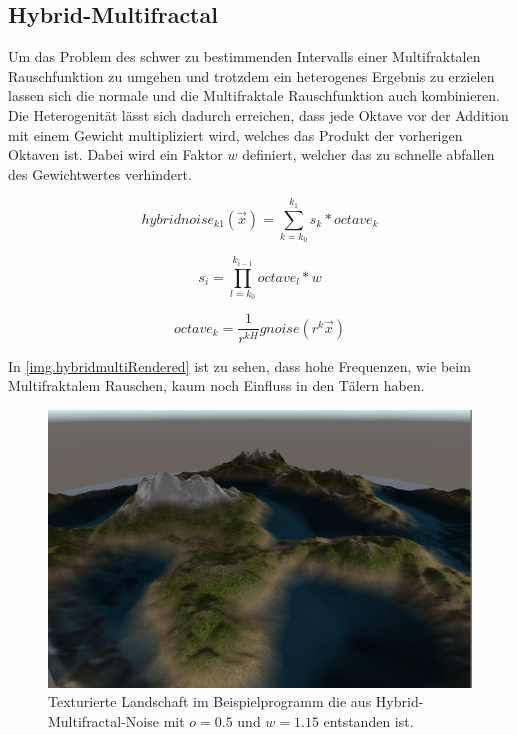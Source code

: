 \subsection{Hybrid-Multifractal}
Um das Problem des schwer zu bestimmenden Intervalls einer Multifraktalen Rauschfunktion zu umgehen und trotzdem ein heterogenes Ergebnis zu erzielen lassen sich die normale und die Multifraktale Rauschfunktion auch kombinieren. 
Die Heterogenität lässt sich dadurch erreichen, dass jede Oktave vor der Addition mit einem Gewicht multipliziert wird, welches das Produkt der vorherigen Oktaven ist. Dabei wird ein Faktor $w$ definiert, welcher das zu schnelle abfallen des Gewichtwertes verhindert.


\begin{equation}
hybridnoise_{k1}(\vec{x}) = \sum_{k=k_0}^{k_1}s_k*octave_k
\end{equation}

\begin{equation}
s_i=\prod_{l=k_0}^{k_{i-1}}octave_l*w
\end{equation}

\begin{equation}
octave_k=\frac{1}{r^{kH}}gnoise(r^k\vec{x})
\end{equation}


In \autoref{img.hybridmultiRendered} ist zu sehen, dass hohe Frequenzen, wie beim Multifraktalem Rauschen, kaum noch Einfluss in den Tälern haben. 

\begin{figure}
	\centering
	\includegraphics[width=\textwidth]{images/hybridmulti_rendered.png}
	\caption{Texturierte Landschaft im Beispielprogramm die aus Hybrid-Multifractal-Noise mit $o=0.5$ und $w=1.15$ entstanden ist.}\label{img.hybridmultiRendered}
\end{figure}


